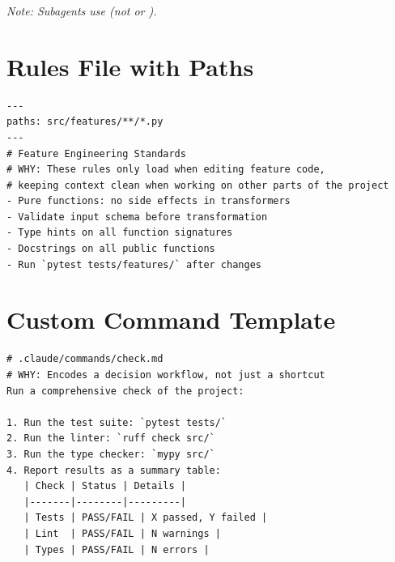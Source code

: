 {\footnotesize \textit{Note: Subagents use  (not  or ).}}

\section{Rules File with Paths}

\begin{verbatim}
---
paths: src/features/**/*.py
---
# Feature Engineering Standards
# WHY: These rules only load when editing feature code,
# keeping context clean when working on other parts of the project
- Pure functions: no side effects in transformers
- Validate input schema before transformation
- Type hints on all function signatures
- Docstrings on all public functions
- Run `pytest tests/features/` after changes
\end{verbatim}

\section{Custom Command Template}

\begin{verbatim}
# .claude/commands/check.md
# WHY: Encodes a decision workflow, not just a shortcut
Run a comprehensive check of the project:

1. Run the test suite: `pytest tests/`
2. Run the linter: `ruff check src/`
3. Run the type checker: `mypy src/`
4. Report results as a summary table:
   | Check | Status | Details |
   |-------|--------|---------|
   | Tests | PASS/FAIL | X passed, Y failed |
   | Lint  | PASS/FAIL | N warnings |
   | Types | PASS/FAIL | N errors |
\end{verbatim}
